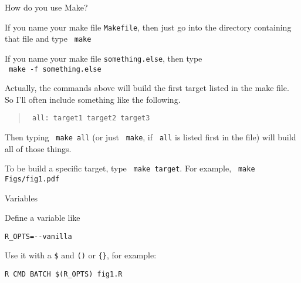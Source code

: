 \documentclass[12pt,t]{beamer}
\begin{document}
\begin{frame}[fragile]{How do you use Make?}

\vspace{6pt}

{\small
\bi
\item If you name your make file {\tt Makefile}, then just go into the
directory containing that file and type {\tt \color{hilit} make}

\item If you name your make file {\tt something.else}, then type \\
{\tt \color{hilit} make -f something.else}

\item Actually, the commands above will build the {\color{vhilit} first}
  target listed in the make file. So I'll often include something like
  the following.

\begin{quote}
{\tt \color{hilit} all: target1 target2 target3}
\end{quote}

  Then typing {\tt \color{hilit} make all} (or just {\tt
    \color{hilit} make}, if {\tt \color{hilit} all} is listed
  first in the file) will build all of those
  things.

\item To be build a specific target, type {\tt \color{hilit} make target}.
  For example, {\tt \color{hilit} make Figs/fig1.pdf}
\ei
}

\end{frame}





\begin{frame}[fragile]{Variables}

  \bbi
\item Define a {\color{vhilit} variable} like

  {\color{hilit} \verb|R_OPTS=--vanilla|}

\item Use it with a \verb|$| and \verb|()| or \verb|{}|, for example:

  {\color{hilit} \verb|R CMD BATCH $(R_OPTS) fig1.R|}

  \ei



\end{frame}
\end{document}
